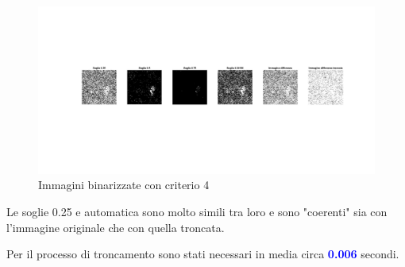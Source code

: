 \begin{figure}[H]
    \centering
     \includegraphics[width=\textwidth]{images/Criterio4.jpg}
    \caption{Immagini binarizzate con criterio 4}
\end{figure}

\noindent Le soglie 0.25 e automatica sono molto simili tra loro e sono "coerenti" sia con l'immagine originale che con quella troncata.

\noindent Per il processo di troncamento sono stati necessari in media circa \textcolor{blue}{\textbf{0.006}} secondi.\\



